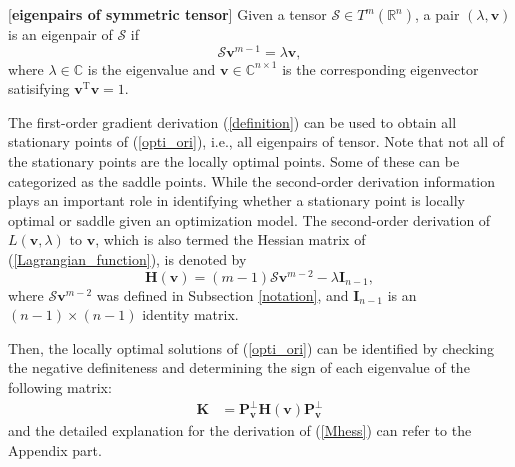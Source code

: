 \begin{definition} \cite{qi,lim} [\textbf{eigenpairs of  symmetric tensor}]
	Given a  tensor $\mathcal S   \in    T^{m}(\mathbb R^{n}) $,
	a pair
	$(\lambda ,\mathbf v )$
	is an  eigenpair  of  
	$\mathcal S  $ 
	if
	\begin{equation}\label{definition}
	\mathcal S \mathbf v^{m-1}=\lambda \mathbf v,
	\end{equation}
	where
$ \lambda  \in  \mathbb C $
is  the  eigenvalue and
$ \mathbf v  \in   \mathbb C^{n \times  1} $
is the  corresponding   eigenvector   satisifying 
$\mathbf v^{\mathrm {T}}\mathbf v=1 $.
\end{definition}






The  first-order    gradient  derivation     (\ref{definition})   can be  used  to    obtain        all   stationary  points  of  (\ref{opti_ori}), i.e., 
all eigenpairs of tensor.   
Note  that   not all of the  stationary  points are  the  locally  optimal  points. 
Some of these    can be  categorized as the saddle points.  
While   the  second-order  derivation  information  plays  an  important  role  in  identifying    whether  a  stationary  point  is     locally    optimal   
or saddle  given    an  optimization   model.      The    second-order derivation  
of
$  L(\mathbf v, \lambda) $ 
to    $ \mathbf v $, which is  also  termed  the Hessian matrix of
(\ref{Lagrangian_function}),  is   denoted
by 
\begin{equation}\label{hessian_matrix}
\mathbf H(\mathbf v) = (m-1)\mathcal S \mathbf v^{m-2} - \lambda \mathbf I_{n-1} ,
\end{equation}
where
$\mathcal S \mathbf v^{m-2} $ was defined in Subsection \ref{notation},
and 
$ \mathbf I_{n-1} $
is an $ (n-1) \times (n-1) $  identity matrix.

Then,  
the 
locally    optimal   solutions of   (\ref{opti_ori})
can  be  identified  by
checking the  negative 
definiteness  
and determining the sign of each  eigenvalue
of the  following  matrix:
	\begin{align}\label{Mhess}
\mathbf {K}
& =  \mathbf  P_{\mathbf  v}^{\bot} \mathbf H (\mathbf v)   \mathbf  P_{\mathbf  v}^{\bot}
	\end{align}
	and the  detailed  explanation for  the  
	derivation of 
	(\ref{Mhess})
	can refer to the Appendix part. 
	

